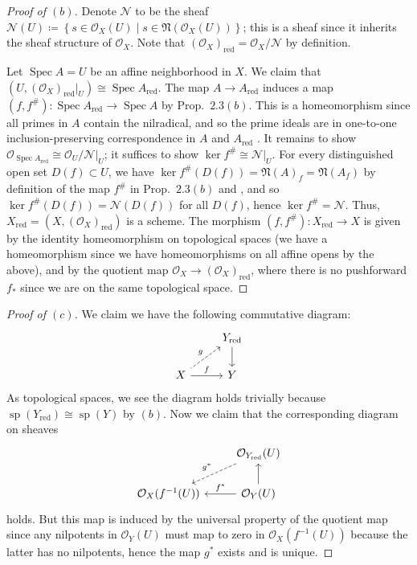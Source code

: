 \documentclass[12pt,letterpaper]{article}
\theoremstyle{definition}
\theoremstyle{remark}
\numberwithin{equation}{section}
\numberwithin{figure}{problem}
\DeclareMathOperator{\Spec}{Spec}
\DeclareMathOperator{\Sp}{sp}
\newcommand{\OO}{\mathcal{O}}
\newcommand{\red}{\mathrm{red}}
\begin{document}
\begin{proof}[Proof of $(b)$]
  Denote $\mathscr{N}$ to be the sheaf $\mathscr{N}(U) \coloneqq \left\{s \in \OO_X(U) \middle\vert s \in \mathfrak{N}(\OO_X(U))\right\}$; this is a sheaf since it inherits the sheaf structure of $\OO_X$. Note that $(\OO_X)_\red = \OO_X/\mathscr{N}$ by definition.
  \par Let $\Spec A = U$ be an affine neighborhood in $X$. We claim that $(U,(\OO_X)_\red\vert_U) \cong \Spec A_\red$. The map $A \to A_\red$ induces a map  $(f,f^\#)\colon \Spec A_\red \to \Spec A$ by Prop.~$2.3(b)$. This is a homeomorphism since all primes in $A$ contain the nilradical, and so the prime ideals are in one-to-one inclusion-preserving correspondence in $A$ and $A_\red$ \cite[Prop.~1.1]{AM69}. It remains to show $\OO_{\Spec A_\red} \cong \OO_U/\mathscr{N}\vert_U$; it suffices to show $\ker f^\# \cong \mathscr{N}\vert_U$. For every distinguished open set $D(f) \subset U$, we have $\ker f^\#(D(f)) = \mathfrak{N}(A)_f = \mathfrak{N}(A_f)$ by definition of the map $f^\#$ in Prop.~$2.3(b)$ and \cite[Cor.~3.12]{AM69}, and so $\ker f^\#(D(f)) = \mathscr{N}(D(f))$ for all $D(f)$, hence $\ker f^\# = \mathscr{N}$. Thus, $X_\red = (X,(\OO_X)_\red)$ is a scheme. The morphism $(f,f^\#)\colon X_\red \to X$ is given by the identity homeomorphism on topological spaces (we have a homeomorphism since we have homeomorphisms on all affine opens by the above), and by the quotient map $\OO_X \to (\OO_X)_\red$, where there is no pushforward $f_*$ since we are on the same topological space.
\end{proof}
\begin{proof}[Proof of $(c)$]
  We claim we have the following commutative diagram:
  \begin{equation*}
    \begin{tikzcd}
      \ & Y_\mathrm{red} \dar\arrow[dashed,leftarrow]{dl}[swap]{g}\\
      X \rar{f} & Y
    \end{tikzcd}
  \end{equation*}
  As topological spaces, we see the diagram holds trivially because $\Sp(Y_\red) \cong \Sp(Y)$ by $(b)$. Now we claim that the corresponding diagram on sheaves
  \begin{equation*}
    \begin{tikzcd}
      \ & \OO_{Y_\mathrm{red}}(U) \dar[leftarrow]\arrow[dashed]{dl}[swap]{g^*}\\
      \OO_X(f^{-1}(U)) \rar[leftarrow]{f^*} & \OO_Y(U)
    \end{tikzcd}
  \end{equation*}
  holds. But this map is induced by the universal property of the quotient map since any nilpotents in $\OO_Y(U)$ must map to zero in $\OO_X(f^{-1}(U))$ because the latter has no nilpotents, hence the map $g^*$ exists and is unique.
\end{proof}
\end{document}
